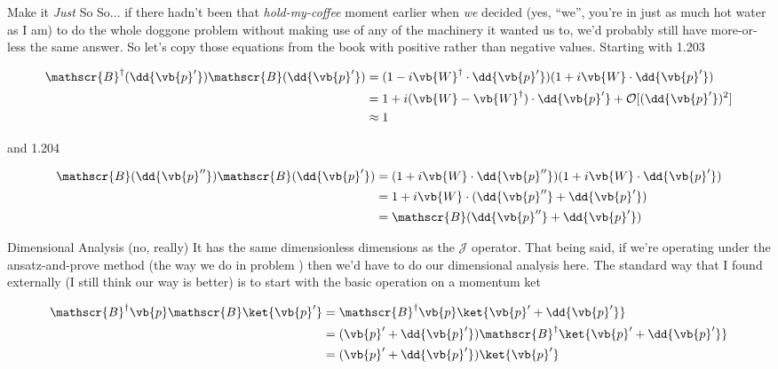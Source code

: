 \begin{answer}
\begin{answerpart}{\texorpdfstring{Make it \emph{Just} So}{Make it Just So}}
    So... if there hadn't been that \emph{hold-my-coffee} moment
    earlier when \emph{we} decided (yes, ``we'', you're in just as
    much hot water as I am) to do the whole doggone problem without
    making use of any of the machinery it wanted us to, we'd probably
    still have more-or-less the same answer.  So let's copy those
    equations from the book with positive rather than negative values.
    Starting with 1.203

    \begin{equation}
      \begin{split}
        \mathscr{B}^{\dagger}(\dd{\vb{p}'})\mathscr{B}(\dd{\vb{p}'})
        &=
        (1 - i\vb{W}^{\dagger}\cdot\dd{\vb{p}'})
        (1 + i\vb{W}\cdot\dd{\vb{p}'})
        \\
        &=
        1
        + i(\vb{W}
        - \vb{W}^{\dagger})\cdot\dd{\vb{p}'}
        + \mathcal{O}[(\dd{\vb{p}'})^2]
        \\
        &\approx 1
        \\
      \end{split}
    \end{equation}

    and 1.204

    \begin{equation}
      \begin{split}
        \mathscr{B}(\dd{\vb{p}''})\mathscr{B}(\dd{\vb{p}'})
        &=
        (1 + i\vb{W}\cdot\dd{\vb{p}''})
        (1 + i\vb{W}\cdot\dd{\vb{p}'})
        \\
        &=
        1 + i\vb{W}\cdot(\dd{\vb{p}''} + \dd{\vb{p}'})
        \\
        &= \mathscr{B}(\dd{\vb{p}''} + \dd{\vb{p}'})
        \\
      \end{split}
    \end{equation}
  \end{answerpart}

  \begin{answerpart}{Dimensional Analysis (no, really)}
    It has the same dimensionless dimensions as the $\mathscr{J}$
    operator.  That being said, if we're operating under the
    ansatz-and-prove method (the way we do in problem
    ) then we'd have to do our dimensional
    analysis here.  The standard way that I found externally (I still
    think our way is better) is to start with the basic operation on a
    momentum ket
    
    \begin{equation}
      \begin{split}
        \mathscr{B}^{\dagger}\vb{p}\mathscr{B}\ket{\vb{p}'}
        &= \mathscr{B}^{\dagger}\vb{p}\ket{\vb{p}' + \dd{\vb{p}'}}\\
        &= (\vb{p}' + \dd{\vb{p}'})\mathscr{B}^{\dagger}\ket{\vb{p}' + \dd{\vb{p}'}}\\
        &= (\vb{p}' + \dd{\vb{p}'})\ket{\vb{p}'}\\
      \end{split}
    \end{equation}


\end{answerpart}
\end{answer}
